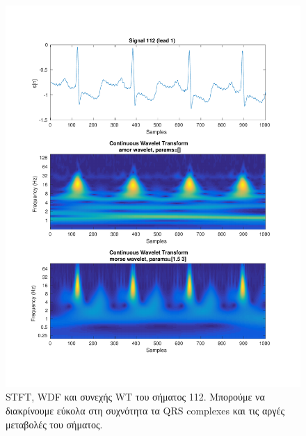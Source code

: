 \documentclass[11pt,a4paper]{article}
\begin{document}
\begin{figure}[H]
\begin{minipage}{0.48\textwidth}
	\includegraphics[width=\textwidth]{fig/112l1_cwt.pdf}
\end{minipage}
\vfill
\caption{STFT, WDF και συνεχής WT του σήματος 112. Μπορούμε να διακρίνουμε εύκολα στη συχνότητα τα QRS complexes και τις αργές μεταβολές του σήματος.}
\label{fig:112l1_stft_wdf_wt}
\end{figure}
\end{document}
